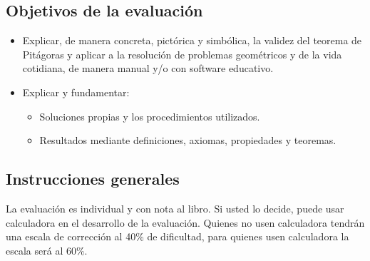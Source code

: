 \documentclass{cdplf-prueba}
\begin{document}
\begin{tcbraster}[enhanced,raster columns=4,raster width=\linewidth,raster column skip=3pt,raster force size=false]
    \begin{caja}[title={\sffamily\scshape\bfseries Nombre},height=30pt,add to width=4.5cm]
    \end{caja}
    \begin{caja}[title=\faIcon{calculator},height=30pt,add to width=-2.5cm]
    \end{caja}
    \begin{caja}[title={\sffamily\scshape\bfseries Puntaje},height=30pt,add to width=-1cm]
    \end{caja}
    \begin{caja}[title={\sffamily\scshape\bfseries Nota},height=30pt,add to width=-1cm]
    \end{caja}                    
\end{tcbraster}

\subsection*{Objetivos de la evaluación}
\begin{itemize}[]
    \item Explicar, de manera concreta, pictórica y simbólica, la validez del teorema de Pitágoras y aplicar a la resolución de problemas geométricos y de la vida cotidiana, de manera manual y/o con software educativo.
    \item Explicar y fundamentar: 
    \begin{itemize}[label=\textbullet]
        \item   Soluciones propias y los procedimientos utilizados.
        \item   Resultados mediante definiciones, axiomas, propiedades y teoremas.
    \end{itemize}
 
\end{itemize}

\subsection*{Instrucciones generales}

La evaluación es individual y con nota al libro. Si usted lo decide, puede usar calculadora 
en el desarrollo de la evaluación. Quienes no usen calculadora tendrán una escala de corrección al 
40\% de dificultad, para quienes usen calculadora la escala será al 60\%.  
\end{document}
